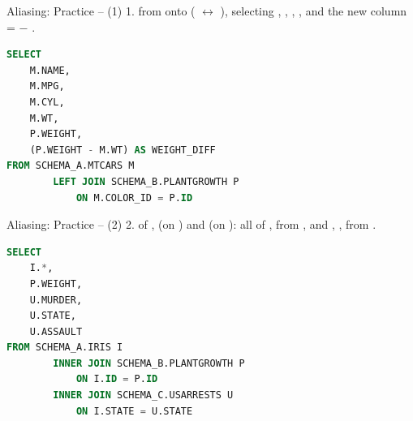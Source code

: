\documentclass{beamer}
\begin{document}
\begin{frame}[fragile]{Aliasing: Practice --  (1)}
{\small 1.   from  onto
 ( $\leftrightarrow$ ), selecting ,
, , , and the new column  =  $-$ .}
\begin{lstlisting}[language=SQL]
SELECT
    M.NAME,
    M.MPG,
    M.CYL,
    M.WT,
    P.WEIGHT,
    (P.WEIGHT - M.WT) AS WEIGHT_DIFF
FROM SCHEMA_A.MTCARS M
        LEFT JOIN SCHEMA_B.PLANTGROWTH P
            ON M.COLOR_ID = P.ID
\end{lstlisting}
\end{frame}

\begin{frame}[fragile]{Aliasing: Practice --  (2)}
{\small 2.  of ,  (on )
and  (on ): all of ,  from
, and , ,  from .}
\begin{lstlisting}[language=SQL]
SELECT
    I.*,
    P.WEIGHT,
    U.MURDER,
    U.STATE,
    U.ASSAULT
FROM SCHEMA_A.IRIS I
        INNER JOIN SCHEMA_B.PLANTGROWTH P
            ON I.ID = P.ID
        INNER JOIN SCHEMA_C.USARRESTS U
            ON I.STATE = U.STATE
\end{lstlisting}
\end{frame}
\end{document}
